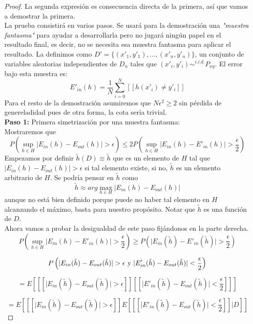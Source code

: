 \begin{proof}
La segunda expresión es consecuencia directa de la primera, así que vamos a demostrar la primera.\\
La prueba consistirá en varios pasos. Se usará para la demostración una \textit{"muestra fantasma"} para ayudar a desarrollarla pero no jugará ningún papel en el resultado final, es decir, no se necesita esa muestra fantasma para aplicar el resultado. La definimos como $D'=\lbrace(x'_{1},y'_{1}),...,(x'_{n},y'_{n})\rbrace$, un conjunto de variables aleatorias independientes de $D_{n}$ tales que $(x'_{i},y'_{i})\sim^{i.i.d.} P_{xy}$. El error bajo esta muestra es:
\[ E'_{in}(h)=\frac{1}{N}\sum_{i=0}^{N}[[h(x'_{i}) \neq y'_{i}]] \] 
Para el resto de la demostración asumiremos que $N\epsilon^{2} \geq 2$ sin pérdida de genereladidad pues de otra forma, la cota sería trivial.\\
\textbf{Paso 1:} Primera simetrización por una muestra fantasma:\\
Mostraremos que 
\[ P \left( \sup_{h \in H} \vert E_{in}(h)-E_{out}(h) \vert >\epsilon \right) \leq 2P \left( \sup_{h \in H} \vert E_{in}(h)-E'_{in}(h) \vert >\frac{\epsilon}{2} \right) \]
Empezamos por definir $\tilde{h}(D) \equiv \tilde{h}$ que es un elemento de $H$ tal que $\vert E_{in}(h)-E_{out}(h) \vert > \epsilon$ si tal elemento existe, si no, $\tilde{h}$ es un elemento arbitrario de $H$. Se podría pensar en $\tilde{h}$ como 
\[ \tilde{h} \approx arg \max_{h \in H} \vert E_{in}(h)-E_{out}(h) \vert \]
aunque no está bien definido porque puede no haber tal elemento en $H$ alcanzando el máximo, basta para nuestro propósito. Notar que $\tilde{h}$ es una función de $D$.\\
Ahora vamos a probar la desigualdad de este paso fijándonos en la parte derecha.
\[ P \left( \sup_{h \in H} \vert E_{in}(h)-E'_{in}(h) \vert >\frac{\epsilon}{2} \right) \geq P \left( \vert E_{in}(\tilde{h})-E'_{in}(\tilde{h}) \vert >\frac{\epsilon}{2} \right) \]

\[ P \left( \vert E_{in}(\tilde{h})-E_{out}(\tilde{h}) \vert > \epsilon \textnormal{ y }\vert E'_{in}(\tilde{h})-E_{out}(\tilde{h}) \vert < \frac{\epsilon}{2} \right) \]

\[ = E \left[ [[\vert E_{in}(\tilde{h})-E_{out}(\tilde{h}) \vert > \epsilon ]] [[ \vert E'_{in}(\tilde{h})-E_{out}(\tilde{h}) \vert < \frac{\epsilon}{2} ]] \right] \]

\[ = E \left[ [[\vert E_{in}(\tilde{h})-E_{out}(\tilde{h}) \vert > \epsilon ]] E \left[ [[ \vert E'_{in}(\tilde{h})-E_{out}(\tilde{h}) \vert < \frac{\epsilon}{2} ]] \bigg\vert D \right] \right] \]


\end{proof}

